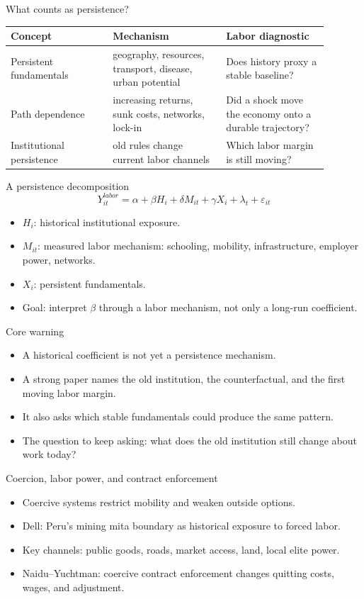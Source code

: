 \documentclass[aspectratio=169,11pt]{beamer}
\begin{document}
\begin{frame}{What counts as persistence?}
\small
\begin{tabular}{p{0.29\linewidth} p{0.31\linewidth} p{0.29\linewidth}}
\toprule
Concept & Mechanism & Labor diagnostic \\
\midrule
Persistent fundamentals & geography, resources, transport, disease, urban potential & Does history proxy a stable baseline? \\
Path dependence & increasing returns, sunk costs, networks, lock-in & Did a shock move the economy onto a durable trajectory? \\
Institutional persistence & old rules change current labor channels & Which labor margin is still moving? \\
\bottomrule
\end{tabular}
\end{frame}

\begin{frame}{A persistence decomposition}
\[
Y_{it}^{labor} = \alpha + \beta H_i + \delta M_{it} + \gamma X_i + \lambda_t + \varepsilon_{it}
\]
\begin{itemize}
    \item $H_i$: historical institutional exposure.
    \item $M_{it}$: measured labor mechanism: schooling, mobility, infrastructure, employer power, networks.
    \item $X_i$: persistent fundamentals.
    \item Goal: interpret $\beta$ through a labor mechanism, not only a long-run coefficient.
\end{itemize}
\end{frame}

\begin{frame}{Core warning}
\begin{itemize}
    \item A historical coefficient is not yet a persistence mechanism.
    \item A strong paper names the old institution, the counterfactual, and the first moving labor margin.
    \item It also asks which stable fundamentals could produce the same pattern.
    \item The question to keep asking: what does the old institution still change about work today?
\end{itemize}
\end{frame}

\begin{frame}{Coercion, labor power, and contract enforcement}
\begin{itemize}
    \item Coercive systems restrict mobility and weaken outside options.
    \item Dell: Peru's mining mita boundary as historical exposure to forced labor.
    \item Key channels: public goods, roads, market access, land, local elite power.
    \item Naidu--Yuchtman: coercive contract enforcement changes quitting costs, wages, and adjustment.
\end{itemize}
\end{frame}
\end{document}
